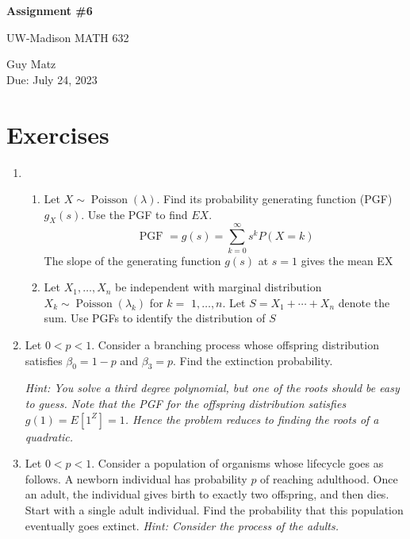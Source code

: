 \documentclass{article} %
\theoremstyle{plain}
\theoremstyle{case}
\begin{document}
\begin{center}
\Large{\textbf{Assignment \#6}
            
UW-Madison MATH 632} %
\vspace{5pt}
        
\normalsize{  Guy Matz%
        \\ Due: July 24, 2023}
\vspace{15pt}
\end{center}

\section*{Exercises}%

\begin{enumerate}[label={\fbox{\textbf{Exercise \#\arabic* :}}}]

  \item 
    \begin{enumerate}
    \item Let $X \sim \operatorname{Poisson}(\lambda)$. Find its probability generating function (PGF) $g_X(s)$. Use the PGF to find $E X$.
      \[ \text{ PGF } = g(s)=\sum_{k=0}^{\infty} s^k P(X=k) \]
    The slope of the generating function $g(s)$ at $s=1$ gives the mean EX

    \item  Let $X_1, \ldots, X_n$ be independent with marginal distribution $X_k \sim \operatorname{Poisson}\left(\lambda_k\right)$ for $k=$ $1, \ldots, n$. Let $S=X_1+\cdots+X_n$ denote the sum. Use PGFs to identify the distribution of $S$
  \end{enumerate}
\newpage
  \item Let $0<p<1$. Consider a branching process whose offspring distribution satisfies $\beta_0=1-p$ and $\beta_3=p$. Find the extinction probability.

    \emph{Hint: You solve a third degree polynomial, but one of the roots should be easy to guess. Note that the PGF for the offspring distribution satisfies $g(1)=E\left[1^Z\right]=1$. Hence the problem reduces to finding the roots of a quadratic.}
\newpage

  \item Let $0<p<1$. Consider a population of organisms whose lifecycle goes as follows. A newborn individual has probability $p$ of reaching adulthood. Once an adult, the individual gives birth to exactly two offspring, and then dies. Start with a single adult individual. Find the probability that this population eventually goes extinct.
    \emph{Hint: Consider the process of the adults.}
\newpage


\end{enumerate}
\end{document}
